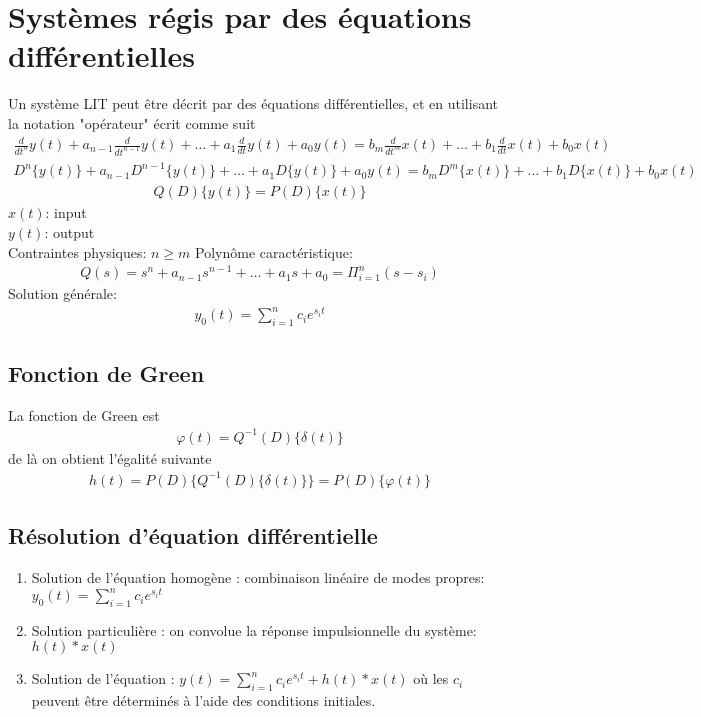 \documentclass[a4paper]{amsart}
\begin{document}
\section{Systèmes régis par des équations différentielles}
Un système LIT peut être décrit par des équations différentielles, et en utilisant la notation "opérateur" écrit comme suit
\begin{eqnarray}
	\frac{d}{dt^n}y(t)+a_{n-1}\frac{d}{dt^{n-1}}y(t)+\dots+a_1\frac{d}{dt}y(t)+a_0y(t)=
	b_m\frac{d}{dt^m}x(t)+\dots+b_1\frac{d}{dt}x(t)+b_0x(t)
\end{eqnarray}
\begin{eqnarray}
	D^n\{y(t)\}+a_{n-1}D^{n-1}\{y(t)\}+\dots+a_1D\{y(t)\}+a_0y(t)=
	b_mD^m\{x(t)\}+\dots+b_1D\{x(t)\}+b_0x(t)
\end{eqnarray}
\begin{eqnarray}
	Q(D)\{y(t)\}=P(D)\{x(t)\}
\end{eqnarray}
$x(t)$: input\\
$y(t)$: output\\
Contraintes physiques: $n\geq m$
Polynôme caractéristique:
\begin{eqnarray}
	Q(s)=s^n+a_{n-1}s^{n-1}+\dots+a_1s+a_0=\Pi_{i=1}^{n}(s-s_i)
\end{eqnarray}
Solution générale:
\begin{eqnarray}
	y_0(t)=\sum_{i=1}^nc_ie^{s_it}
\end{eqnarray}
\subsection{Fonction de Green}
La fonction de Green est
\begin{eqnarray}
	\varphi(t)=Q^{-1}(D)\{\delta(t)\}
\end{eqnarray}
de là on obtient l'égalité suivante
\begin{eqnarray}
	h(t)=P(D)\{Q^{-1}(D)\{\delta(t)\}\}=P(D)\{\varphi(t)\}
\end{eqnarray}

\subsection{Résolution d'équation différentielle}
\begin{enumerate}
	\item Solution de l’équation homogène : combinaison linéaire de modes propres: $y_0(t)=\sum_{i=1}^nc_ie^{s_it}$
	\item Solution particulière : on convolue la réponse impulsionnelle du système: $h(t)*x(t)$
	\item Solution de l’équation : $y(t)=\sum_{i=1}^nc_ie^{s_it}+h(t)*x(t)$ où les $c_i$ peuvent être déterminés à l'aide des conditions initiales.
\end{enumerate}
\end{document}
